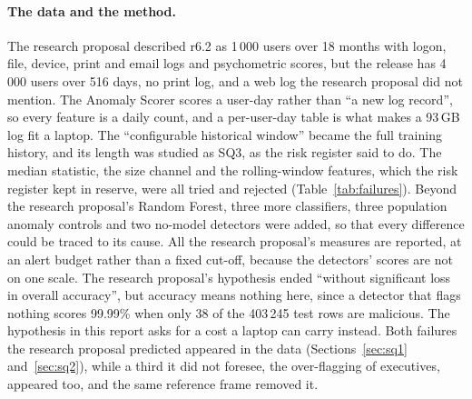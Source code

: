 \documentclass[a4paper,12pt]{article}
\begin{document}
\paragraph{The data and the method.} The research proposal described r6.2 as 1\,000 users over 18 months with logon, file, device, print and email logs and psychometric scores, but the release has 4\,000 users over 516 days, no print log, and a web log the research proposal did not mention. The Anomaly Scorer scores a user-day rather than ``a new log record'', so every feature is a daily count, and a per-user-day table is what makes a 93\,GB log fit a laptop. The ``configurable historical window'' became the full training history, and its length was studied as SQ3, as the risk register said to do. The median statistic, the size channel and the rolling-window features, which the risk register kept in reserve, were all tried and rejected (Table~\ref{tab:failures}). Beyond the research proposal's Random Forest, three more classifiers, three population anomaly controls and two no-model detectors were added, so that every difference could be traced to its cause. All the research proposal's measures are reported, at an alert budget rather than a fixed cut-off, because the detectors' scores are not on one scale. The research proposal's hypothesis ended ``without significant loss in overall accuracy'', but accuracy means nothing here, since a detector that flags nothing scores 99.99\% when only 38 of the 403\,245 test rows are malicious. The hypothesis in this report asks for a cost a laptop can carry instead. Both failures the research proposal predicted appeared in the data (Sections~\ref{sec:sq1} and~\ref{sec:sq2}), while a third it did not foresee, the over-flagging of executives, appeared too, and the same reference frame removed it.
\end{document}
